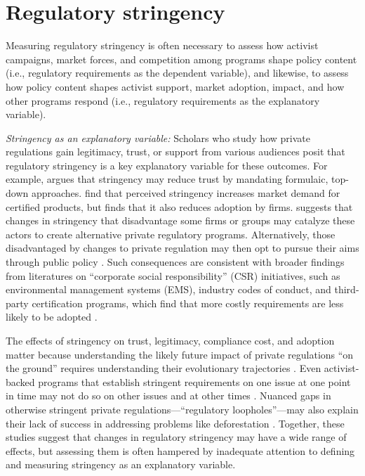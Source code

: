\documentclass[
      12pt,
            Review ]{article}
\begin{document}
\section{Regulatory stringency}\label{regulatory-stringency}

Measuring regulatory stringency is often necessary to assess how
activist campaigns, market forces, and competition among programs shape
policy content (i.e., regulatory requirements as the dependent
variable), and likewise, to assess how policy content shapes activist
support, market adoption, impact, and how other programs respond (i.e.,
regulatory requirements as the explanatory variable).

\emph{Stringency as an explanatory variable:} Scholars who study how
private regulations gain legitimacy, trust, or support from various
audiences posit that regulatory stringency is a key explanatory variable
for these outcomes. For example, \citet{McDermott2012} argues that
stringency may reduce trust by mandating formulaic, top-down approaches.
\citet{Atkinson2014} find that perceived stringency increases market
demand for certified products, but \citet{Prado2013} finds that it also
reduces adoption by firms. \citet{Meidinger2003} suggests that changes
in stringency that disadvantage some firms or groups may catalyze these
actors to create alternative private regulatory programs. Alternatively,
those disadvantaged by changes to private regulation may then opt to
pursue their aims through public policy \citep{Weimer2006}. Such
consequences are consistent with broader findings from literatures on
``corporate social responsibility'' (CSR) initiatives, such as
environmental management systems (EMS), industry codes of conduct, and
third-party certification programs, which find that more costly
requirements are less likely to be adopted
\citep{Delmas2008, Kollman2001, Lyon2008}.

The effects of stringency on trust, legitimacy, compliance cost, and
adoption matter because understanding the likely future impact of
private regulations ``on the ground'' requires understanding their
evolutionary trajectories \citep{VanderVen2018}. Even activist-backed
programs that establish stringent requirements on one issue at one point
in time may not do so on other issues and at other times
\citep{LeBaron2018}. Nuanced gaps in otherwise stringent private
regulations---``regulatory loopholes''---may also explain their lack of
success in addressing problems like deforestation \citep{VanderVen2018}.
Together, these studies suggest that changes in regulatory stringency
may have a wide range of effects, but assessing them is often hampered
by inadequate attention to defining and measuring stringency as an
explanatory variable.
\end{document}
